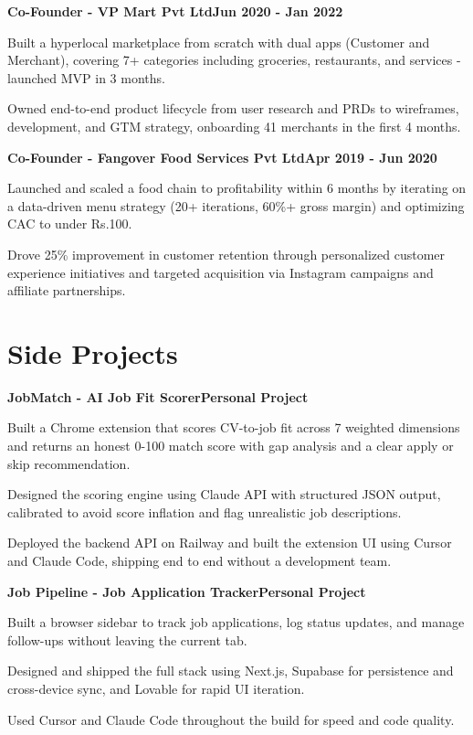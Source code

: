 \documentclass[letterpaper,11pt]{article}
\newcommand{\heading}[2]{
  \hspace{10pt}#1\hfill#2\\
}
\newcommand{\headingBf}[2]{
  \heading{\textbf{#1}}{\textbf{#2}}
}
\newenvironment{resume_list}{
  \vspace{-7pt}
  \begin{itemize}[itemsep=-2px, parsep=1pt, leftmargin=30pt]
}{
  \end{itemize}
}
\begin{document}
  \vspace{4pt}
  \headingBf{Co-Founder - VP Mart Pvt Ltd}{Jun 2020 - Jan 2022}
  \begin{resume_list}
    \item Built a hyperlocal marketplace from scratch with dual apps (Customer and Merchant), covering 7+ categories including groceries, restaurants, and services - launched MVP in 3 months.
    \item Owned end-to-end product lifecycle from user research and PRDs to wireframes, development, and GTM strategy, onboarding 41 merchants in the first 4 months.
  \end{resume_list}
  \vspace{4pt}
  \headingBf{Co-Founder - Fangover Food Services Pvt Ltd}{Apr 2019 - Jun 2020}
  \begin{resume_list}
    \item Launched and scaled a food chain to profitability within 6 months by iterating on a data-driven menu strategy (20+ iterations, 60\%+ gross margin) and optimizing CAC to under Rs.100.
    \item Drove 25\% improvement in customer retention through personalized customer experience initiatives and targeted acquisition via Instagram campaigns and affiliate partnerships.
  \end{resume_list}

  \section{Side Projects}
  \headingBf{JobMatch - AI Job Fit Scorer}{Personal Project}
  \begin{resume_list}
    \item Built a Chrome extension that scores CV-to-job fit across 7 weighted dimensions and returns an honest 0-100 match score with gap analysis and a clear apply or skip recommendation.
    \item Designed the scoring engine using Claude API with structured JSON output, calibrated to avoid score inflation and flag unrealistic job descriptions.
    \item Deployed the backend API on Railway and built the extension UI using Cursor and Claude Code, shipping end to end without a development team.
  \end{resume_list}
  \vspace{4pt}
  \headingBf{Job Pipeline - Job Application Tracker}{Personal Project}
  \begin{resume_list}
    \item Built a browser sidebar to track job applications, log status updates, and manage follow-ups without leaving the current tab.
    \item Designed and shipped the full stack using Next.js, Supabase for persistence and cross-device sync, and Lovable for rapid UI iteration.
    \item Used Cursor and Claude Code throughout the build for speed and code quality.
  \end{resume_list}
\end{document}
